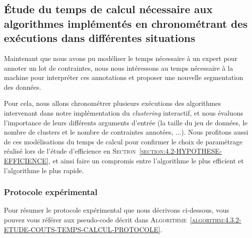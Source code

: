 	\subsection{Étude du temps de calcul nécessaire aux algorithmes implémentés en chronométrant des exécutions dans différentes situations}
	\label{section:4.3.2-ETUDE-COUTS-TEMPS-CALCUL}
		
		Maintenant que nous avons pu modéliser le temps nécessaire à un expert pour annoter un lot de contraintes, nous nous intéressons au temps nécessaire à la machine pour interpréter ces annotations et proposer une nouvelle segmentation des données.
		
		Pour cela, nous allons chronométrer plusieurs exécutions des algorithmes intervenant dans notre implémentation du \textit{clustering} interactif, et nous évaluons l'importance de leurs différents arguments d'entrée (la taille du jeu de données, le nombre de clusters et le nombre de contraintes annotées, ...).
		Nous profitons aussi de ces modélisations du temps de calcul pour confirmer le choix de paramétrage réalisé lors de l'étude d'efficience en \textsc{Section~\ref{section:4.2-HYPOTHESE-EFFICIENCE}}, et ainsi faire un compromis entre l'algorithme le plus efficient et l'algorithme le plus rapide.
	
		\subsubsection{Protocole expérimental}
			
			Pour résumer le protocole expérimental que nous décrivons ci-dessous, vous pouvez vous référer aux pseudo-code décrit dans \textsc{Algorithme~\ref{algorithm:4.3.2-ETUDE-COUTS-TEMPS-CALCUL-PROTOCOLE}}.
			
